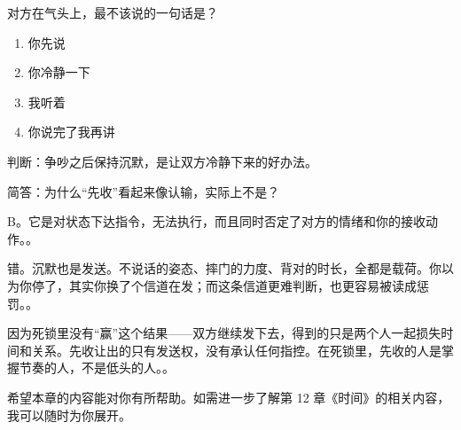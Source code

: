 \begin{quizsec}
\item 对方在气头上，最不该说的一句话是？

\begin{enumerate}[label=\Alph*., leftmargin=2.2em, labelsep=0.6em,
                  itemsep=0.2em, topsep=0.3em, parsep=0.1em]
\item 你先说
\item 你冷静一下
\item 我听着
\item 你说完了我再讲
\end{enumerate}

\item 判断：争吵之后保持沉默，是让双方冷静下来的好办法。

\item 简答：为什么“先收”看起来像认输，实际上不是？
\end{quizsec}

\begin{answerssec}
\item B。它是对状态下达指令，无法执行，而且同时否定了对方的情绪和你的接收动作。。

\item 错。沉默也是发送。不说话的姿态、摔门的力度、背对的时长，全都是载荷。你以为你停了，其实你换了个信道在发；而这条信道更难判断，也更容易被读成惩罚。。

\item 因为死锁里没有“赢”这个结果——双方继续发下去，得到的只是两个人一起损失时间和关系。先收让出的只有发送权，没有承认任何指控。在死锁里，先收的人是掌握节奏的人，不是低头的人。。
\end{answerssec}

\hcirule

\begin{qabox}
\end{qabox}

\hcirule

\begin{qabox}
\end{qabox}

\hcirule

希望本章的内容能对你有所帮助。如需进一步了解第 12 章《时间》的相关内容，我可以随时为你展开。

